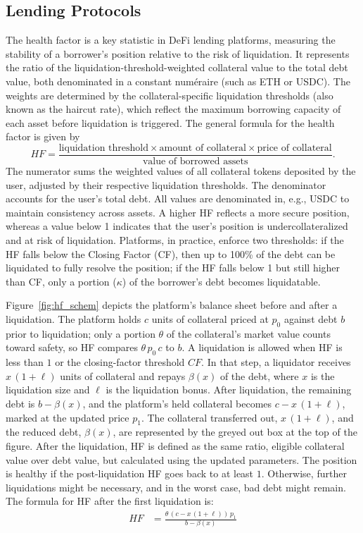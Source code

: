 \documentclass[11pt]{article} %
\begin{document}
\subsection{Lending Protocols}\label{sec:background-lending}
The health factor is a key statistic in DeFi lending platforms, measuring the stability of a borrower's position relative to the risk of liquidation. It represents the ratio of the liquidation-threshold-weighted collateral value to the total debt value, both denominated in a constant num\'{e}raire (such as ETH or USDC). The weights are determined by the collateral-specific liquidation thresholds (also known as the haircut rate), which reflect the maximum borrowing capacity of each asset before liquidation is triggered. The general formula for the health factor is given by
$$HF= \frac{\text{liquidation threshold}\times \text{amount of collateral} \times \text{price of collateral}}{\text{value of borrowed assets}}.
$$
The numerator sums the weighted values of all collateral tokens deposited by the user, adjusted by their respective liquidation thresholds. The denominator accounts for the user’s total debt. All values are denominated in, e.g., USDC to maintain consistency across assets. A higher HF reflects a more secure position, whereas a value below 1 indicates that the user’s position is undercollateralized and at risk of liquidation. Platforms, in practice, enforce two thresholds: if the HF falls below the Closing Factor (CF), then up to 100\% of the debt can be liquidated to fully resolve the position; if the HF falls below 1 but still higher than CF, only a portion ($\kappa$) of the borrower's debt becomes liquidatable.

Figure~\ref{fig:hf_schem} depicts the platform’s balance sheet before and after a liquidation. The platform holds $c$ units of collateral priced at $p_0$ against debt $b$ prior to liquidation; only a portion $\theta$ of the collateral's market value counts toward safety, so HF compares $\theta\,p_0\,c$ to $b$. A liquidation is allowed when HF is less than $1$ or the closing-factor threshold $CF$. In that step, a liquidator receives $x\,(1+\ell)$ units of collateral and repays $\beta(x)$ of the debt, where $x$ is the liquidation size and $\ell$ is the liquidation bonus. After liquidation, the remaining debt is $b-\beta(x)$, and the platform's held collateral becomes $c-x\,(1+\ell)$, marked at the updated price $p_1$. The collateral transferred out, $x\,(1+\ell)$, and the reduced debt, $\beta(x)$, are represented by the greyed out box at the top of the figure. After the liquidation, HF is defined as the same ratio, eligible collateral value over debt value, but calculated using the updated parameters. The position is healthy if the post-liquidation HF goes back to at least $1$. Otherwise, further liquidations might be necessary, and in the worst case, bad debt might remain. The formula for HF after the first liquidation is:
\begin{align}
HF&=\frac{\theta\,(c-x\,(1+\ell))\,p_1}{b-\beta(x)}\label{eq:hf_schem}
\end{align}
\end{document}
